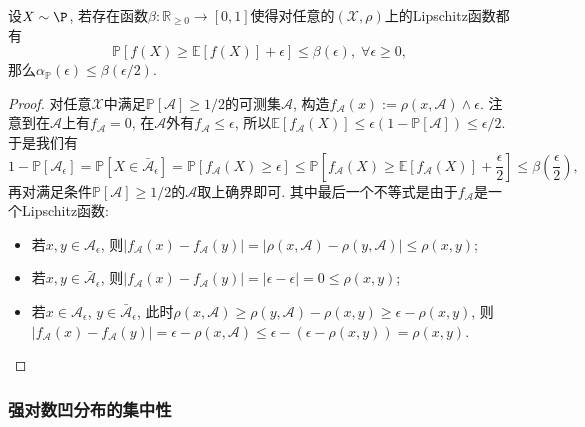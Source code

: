 \begin{theorem}
	设$X \sim \P$, 若存在函数$\beta \colon \mathbb{R}_{\geq 0} \to [0, 1]$使得对任意的$(\mathcal{X}, \rho)$上的Lipschitz函数都有
	\begin{equation*}
		\mathbb{P}[f(X) \geq \mathbb{E}[f(X)] + \epsilon] \leq \beta(\epsilon),\; \forall \epsilon \geq 0, 
	\end{equation*}
	那么$\alpha_{\mathbb{P}}(\epsilon) \leq \beta(\epsilon / 2)$. 
\end{theorem}
\begin{proof}
	对任意$\mathcal{X}$中满足$\mathbb{P}[\mathcal{A}] \geq 1/2$的可测集$\mathcal{A}$, 构造$f_\mathcal{A}(x) := \rho(x, \mathcal{A}) \wedge \epsilon$. 
	注意到在$\mathcal{A}$上有$f_\mathcal{A} = 0$, 在$\mathcal{A}$外有$f_\mathcal{A} \leq \epsilon$, 所以$\mathbb{E}[f_\mathcal{A}(X)] \leq \epsilon (1 - \mathbb{P}[\mathcal{A}]) \leq \epsilon / 2$. 
	于是我们有
	\begin{equation*}
		1 - \mathbb{P}[\mathcal{A}_{\epsilon}]
		= \mathbb{P}[X \in \bar{\mathcal{A}}_{\epsilon}]
		= \mathbb{P}[f_\mathcal{A}(X) \geq \epsilon] 
		\leq \mathbb{P}\left[f_\mathcal{A}(X) \geq \mathbb{E}[f_\mathcal{A}(X)] + \frac{\epsilon}{2}\right]
		\leq \beta\left( \frac{\epsilon}{2} \right),  
	\end{equation*}
	再对满足条件$\mathbb{P}[\mathcal{A}] \geq 1/2$的$\mathcal{A}$取上确界即可. 
	其中最后一个不等式是由于$f_\mathcal{A}$是一个Lipschitz函数: 
	\begin{itemize}
		\item 若$x, y \in \mathcal{A}_{\epsilon}$, 则$|f_\mathcal{A}(x) - f_\mathcal{A}(y)| = |\rho(x, \mathcal{A}) - \rho(y, \mathcal{A}) | \leq  \rho(x, y)$; 
		\item 若$x, y \in \bar{\mathcal{A}}_{\epsilon}$, 则$|f_\mathcal{A}(x) - f_\mathcal{A}(y)| = |\epsilon - \epsilon| = 0 \leq \rho(x, y)$;
		\item 若$x \in \mathcal{A}_{\epsilon}$, $y \in \bar{\mathcal{A}}_{\epsilon}$, 此时$\rho(x, \mathcal{A}) \geq \rho(y, \mathcal{A}) - \rho(x, y) \geq \epsilon - \rho(x, y)$, 则$|f_\mathcal{A}(x) - f_\mathcal{A}(y)| =  \epsilon - \rho(x, \mathcal{A}) \leq \epsilon - (\epsilon - \rho(x, y)) = \rho(x, y)$.
	\end{itemize}
\end{proof}

\subsubsection{强对数凹分布的集中性}

